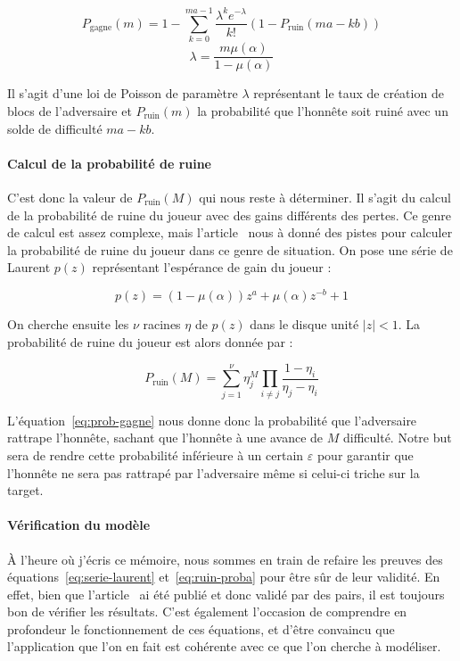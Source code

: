 	\begin{equation}\label{eq:prob-gagne}
		P_{\text{gagne}}(m) = 1 - \sum_{k=0}^{ma-1} {
			\frac{\lambda^k e^{-\lambda}}{k!}
			(1 - P_{\text{ruin}}(ma-kb))
		}
	\end{equation}
	\vspace{0.3cm}
	\begin{equation}
		\lambda = \frac{m \mu(\alpha)}{1-\mu(\alpha)}
	\end{equation}

	Il s'agit d'une loi de Poisson de paramètre $\lambda$ représentant le taux de
	création de blocs de l'adversaire et $P_{\text{ruin}}(m)$ la probabilité que
	l'honnête soit ruiné avec un solde de difficulté $ma-kb$.

	\paragraph{Calcul de la probabilité de ruine} C'est donc la valeur de
	$P_{\text{ruin}}(M)$ qui nous reste à déterminer. Il s'agit du calcul de la
	probabilité de ruine du joueur avec des gains différents des pertes. Ce genre
	de calcul est assez complexe, mais l'article~\cite{gamblers} nous à donné des
	pistes pour calculer la probabilité de ruine du joueur dans ce genre de
	situation. On pose une série de Laurent $p(z)$ représentant l'espérance de
	gain du joueur :
	
	\begin{equation}\label{eq:serie-laurent}
		p(z) = (1-\mu(\alpha)) z^{a} + \mu(\alpha) z^{-b} + 1
	\end{equation}

	On cherche ensuite les $\nu$ racines $\eta$ de $p(z)$ dans le disque unité
	$|z| < 1$. La probabilité de ruine du joueur est alors donnée par :

	\begin{equation}\label{eq:ruin-proba}
		P_\text{ruin}(M) = \sum_{j=1}^{\nu} {
			\eta^M_j \prod_{i\neq j} \frac{1 - \eta_i}{\eta_j - \eta_i}
		}	
	\end{equation}

	L'équation~\ref{eq:prob-gagne} nous donne donc la probabilité que l'adversaire
	rattrape l'honnête, sachant que l'honnête à une avance de $M$ difficulté.
	Notre but sera de rendre cette probabilité inférieure à un certain
	$\varepsilon$ pour garantir que l'honnête ne sera pas rattrapé par
	l'adversaire même si celui-ci triche sur la target.

	\paragraph{Vérification du modèle} À l'heure où j'écris ce mémoire, nous 
	sommes en train de refaire les preuves des équations~\ref{eq:serie-laurent}
	et~\ref{eq:ruin-proba} pour être sûr de leur validité. En effet, bien que
	l'article~\cite{gamblers} ai été publié et donc validé par des pairs, il est
	toujours bon de vérifier les résultats. C'est également l'occasion de 
	comprendre en profondeur le fonctionnement de ces équations, et d'être 
	convaincu que l'application que l'on en fait est cohérente avec ce que 
	l'on cherche à modéliser.


